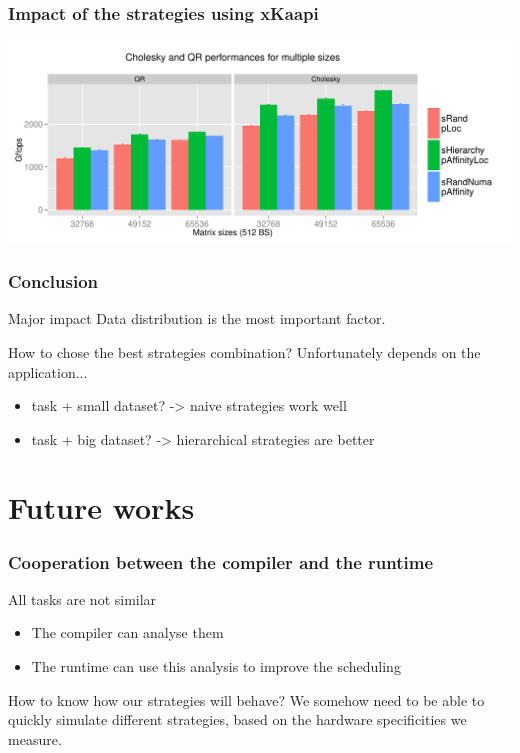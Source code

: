 \documentclass[xcolor={usenames,dvipsnames,svgnames,table}, aspectratio=43]{beamer}
\begin{document}
\begin{frame}
  \frametitle{Impact of the strategies using xKaapi}
  \begin{center}
    \includegraphics[width=\textwidth]{graph/graph_details_strat.pdf}
  \end{center}
\end{frame}


\begin{frame}
  \frametitle{Conclusion}
  \begin{block}{Major impact}
    Data distribution is the most important factor.
  \end{block}

  \begin{block}{How to chose the best strategies combination?}
    Unfortunately depends on the application...

    \begin{itemize}
      \item task + small dataset? -> naive strategies work well
      \item task + big dataset? -> hierarchical strategies are better
    \end{itemize}
  \end{block}
\end{frame}

\section{Future works}



\begin{frame}[fragile]
  \frametitle{Cooperation between the compiler and the runtime}

\begin{block}{All tasks are not similar}
  \begin{itemize}
    \item The compiler can analyse them
    \item The runtime can use this analysis to improve the scheduling
  \end{itemize}
\end{block}

\begin{block}{How to know how our strategies will behave?}
  We somehow need to be able to quickly simulate different strategies, based on the hardware specificities we measure.
\end{block}


\end{frame}
\end{document}
